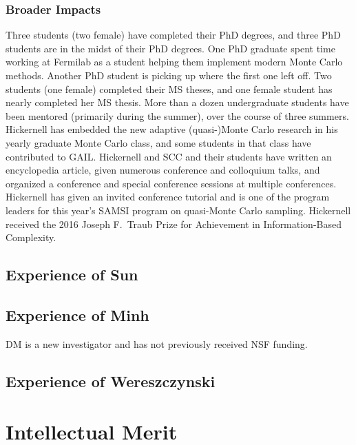 \documentclass[11pt]{NSFamsart}
\begin{document}
\subsubsection{Broader Impacts}  Three students (two female) have completed their PhD degrees, and three PhD students are in the midst of their PhD degrees.  One PhD graduate spent time working at Fermilab as a student helping them implement modern Monte Carlo methods.  Another PhD student is picking up where the first one left off.  Two students (one female) completed their MS theses, and one female student has nearly completed her MS thesis. More than a dozen undergraduate students have been mentored (primarily during the summer),  over the course of three summers.  Hickernell has embedded the new adaptive (quasi-)Monte Carlo research in his yearly graduate Monte Carlo class, and some students in that class have contributed to GAIL.  Hickernell and SCC and their students have written an encyclopedia article, given numerous conference and colloquium talks, and organized a conference and special conference sessions at multiple conferences.  Hickernell has given an invited conference tutorial and is one of the program leaders for this year's SAMSI program on quasi-Monte Carlo sampling. Hickernell received the 2016 Joseph F.\ Traub Prize for Achievement in Information-Based Complexity.






\subsection{Experience of Sun}

\subsection{Experience of Minh}

DM is a new investigator and has not previously received NSF funding. 



\subsection{Experience of Wereszczynski}



\section{Intellectual Merit}
\end{document}
